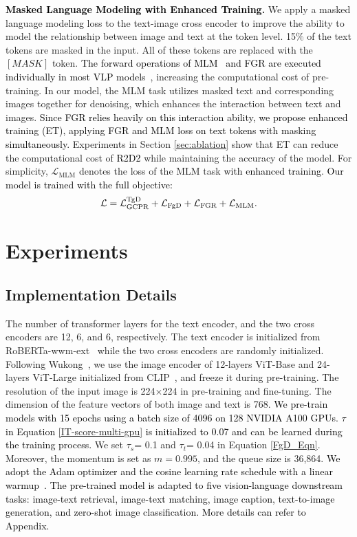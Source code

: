 \documentclass[sigconf]{acmart}
\def\mL{{\mathcal L}}
\def\blue{\textcolor{black}}
\def\mmxie{\textcolor{black}}
\def\mmljc{\textcolor{black}}
\def\mmcr{\textcolor{black}}
\begin{document}
\textbf{\blue{Masked Language Modeling with Enhanced Training}.}
We apply a masked language modeling loss to the text-image cross encoder to improve the ability to model the relationship between image and text at the token level. 15\% of the text tokens are masked in the input. All of these tokens are replaced with the $[MASK]$ token.
\mmxie{The forward operations of MLM~\cite{bert} and \mmcr{FGR} are executed individually in most VLP models~\cite{uniter,ALBEF,FLAVA}}, increasing the computational cost of pre-training. In our model, the MLM task utilizes masked text and corresponding images together for denoising, which enhances the interaction between text and images. \mmxie{Since \mmcr{FGR} relies heavily on this interaction ability, we propose enhanced training (ET), applying \mmcr{FGR} and MLM loss on text tokens with masking simultaneously.}
Experiments in Section \ref{sec:ablation} show that ET can reduce the computational cost of \mmcr{R2D2} while maintaining the accuracy of the model. For simplicity, $\mL_{\text{MLM}}$ denotes the loss of the MLM task \blue{with enhanced training}.
\mmxie{Our model is trained with the full objective:
\begin{align}
    \mL = \mL_{\text{GCPR}}^{\text{TgD}}+\mL_{\text{FgD}}+\mL_{\text{\mmcr{FGR}}}+\mL_{\text{MLM}}.
\end{align}
}

\section{Experiments}
\subsection{Implementation Details}\label{sec:implementation}
The number of transformer layers for the text encoder, and the two cross encoders are 12, 6, and 6, respectively. 
The text encoder is initialized from RoBERTa-wwm-ext~\cite{chinesebert} while the two cross encoders are randomly initialized.
Following Wukong~\cite{gu2022wukong}, we use the image encoder of 12-layers ViT-Base and 24-layers ViT-Large initialized from CLIP~\cite{CLIP}, and freeze it during pre-training. 
The resolution of the input image is 224$ \times $224 in pre-training and fine-tuning. The dimension of the feature vectors of both image and text is 768. \blue{We pre-train models with 15 epochs using a batch size of 4096 on 128 NVIDIA A100 GPUs.}
\mmcr{$\tau$ in Equation \ref{IT-score-multi-gpu} is initialized to 0.07 and can be learned during the training process.}
We set $\tau_s$= 0.1 and $\tau_t$= 0.04 in Equation \ref{FgD_Eqn}.
Moreover, the momentum is set as $m= 0.995$, and the queue size is 36,864.
\blue{We adopt the Adam optimizer and the cosine learning rate schedule with a linear warmup~\cite{loshchilov2016sgdr}.}
\blue{The pre-trained model is adapted to five vision-language downstream tasks: image-text retrieval, image-text matching, image caption, text-to-image generation, and zero-shot image classification.}
\mmljc{More details can refer to Appendix.}
\end{document}
